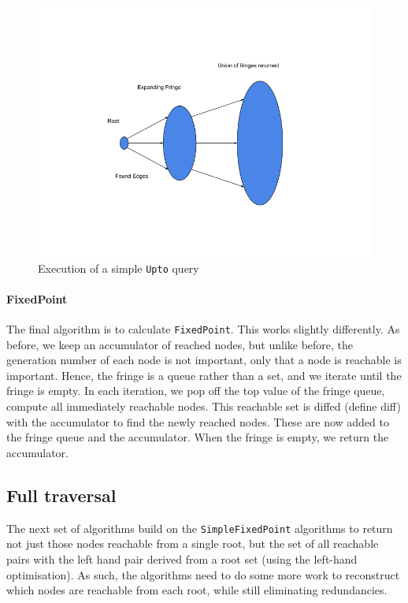 \documentclass[12pt,a4paper,twoside,openright]{report}
\newcommand\codeName[1]{\texttt{#1}}
\begin{document}
\begin{figure}[ht]
\centering
  \includegraphics[width=\textwidth]{figs/Upto.png}
  \caption{Execution of a simple \codeName{Upto} query}
  \label{fig:UptoSingle}
\end{figure}
	
		\paragraph{FixedPoint}
The  final algorithm is to calculate \codeName{FixedPoint}. This works slightly differently. As before, we keep an accumulator of reached nodes, but unlike before, the generation number of each node is not important, only that a node is reachable is important. Hence, the fringe is a queue rather than a set, and we iterate until the fringe is empty. In each iteration, we pop off the top value of the fringe queue, compute all immediately reachable nodes. This reachable set is diffed (define diff) with the accumulator to find the newly reached nodes. These are now added to the fringe queue and the accumulator. When the fringe is empty, we return the accumulator.
	
	\subsection{Full traversal}
		The next set of algorithms build on the \codeName{SimpleFixedPoint} algorithms to return not just those nodes reachable from a single root, but the set of all reachable pairs with the left hand pair derived from a root set (using the left-hand optimisation). As such, the algorithms need to do some more work to reconstruct which nodes are reachable from each root, while still eliminating redundancies.
\end{document}
